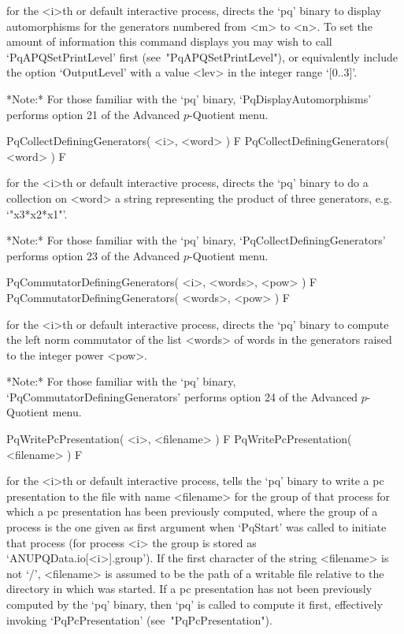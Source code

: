 for the <i>th or default interactive {\ANUPQ} process, directs  the  `pq'
binary to display automorphisms for the generators numbered from  <m>  to
<n>. To set the amount of information this command displays you may  wish
to  call  `PqAPQSetPrintLevel'   first   (see~"PqAPQSetPrintLevel"),   or
equivalently include the option `OutputLevel' with a value <lev>  in  the
integer range `[0..3]'.

*Note:* 
For  those  familiar  with  the  `pq'  binary,   `PqDisplayAutomorphisms'
performs option 21 of the Advanced $p$-Quotient menu.

\>PqCollectDefiningGenerators( <i>, <word> ) F
\>PqCollectDefiningGenerators( <word> ) F

for the <i>th or default interactive {\ANUPQ} process, directs  the  `pq'
binary to do a collection on <word> a string representing the product  of
three generators, e.g. `"x3*x2*x1"'.

*Note:*
For those familiar with the  `pq'  binary,  `PqCollectDefiningGenerators'
performs option 23 of the Advanced $p$-Quotient menu.

\>PqCommutatorDefiningGenerators( <i>, <words>, <pow> ) F
\>PqCommutatorDefiningGenerators( <words>, <pow> ) F

for the <i>th or default interactive {\ANUPQ} process, directs  the  `pq'
binary to compute the left norm commutator of the list <words>  of  words
in the generators raised to the integer power <pow>.

*Note:*
For those familiar with the `pq' binary, `PqCommutatorDefiningGenerators'
performs option 24 of the Advanced $p$-Quotient menu.

\>PqWritePcPresentation( <i>, <filename> ) F
\>PqWritePcPresentation( <filename> ) F

for the <i>th or default interactive {\ANUPQ}  process,  tells  the  `pq'
binary to write a pc presentation to the file with  name  <filename>  for
the group of that process for which a pc presentation has been previously
computed, where the group of a process is the one given as first argument
when `PqStart' was called to initiate that process (for process  <i>  the
group is stored as `ANUPQData.io[<i>].group'). If the first character  of
the string <filename> is not `/', <filename> is assumed to be the path of
a writable file relative to the directory in which {\GAP} was started. If
a pc presentation has not been previously computed by  the  `pq'  binary,
then  `pq'  is  called  to  compute  it   first,   effectively   invoking
`PqPcPresentation' (see~"PqPcPresentation").

